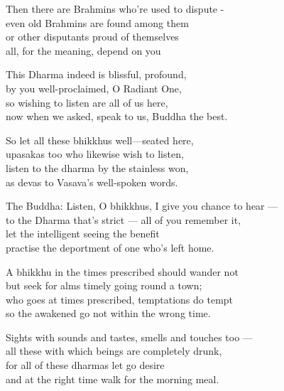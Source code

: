 \begin{MyDescription}{}
 Then there are Brahmins who're used to dispute -\\
 even old Brahmins are found among them\\
or other disputants proud of themselves\\
all, for the meaning, depend on you
\end{MyDescription}

\begin{MyDescription}{}
This Dharma indeed is blissful, profound,\\
by you well-proclaimed, O Radiant One,\\
so wishing to listen are all of us here,\\
now when we asked, speak to us, Buddha the best.
\end{MyDescription}

\begin{MyDescription}{}
So let all these bhikkhus well—seated here,\\
upasakas too who likewise wish to listen,\\
listen to the dharma by the stainless won,\\
as devas to Vasava's well-spoken words.

\end{MyDescription}

\begin{MyDescription}{The Buddha:}
Listen, O bhikkhus, I give you chance to hear —\\
to the Dharma that's strict — all of you remember it,\\
let the intelligent seeing the benefit\\
practise the deportment of one who's left home.
\end{MyDescription}

\begin{MyDescription}{}
A bhikkhu in the times prescribed should wander not\\
but seek for alms timely going round a town;\\
who goes at times prescribed, temptations do tempt\\
so the awakened go not within the wrong time.
\end{MyDescription}


\begin{MyDescription}{}
Sights with sounds and tastes, smells and touches too —\\
all these with which beings are completely drunk,\\
for all of these dharmas let go desire\\
and at the right time walk for the morning meal.
\end{MyDescription}

